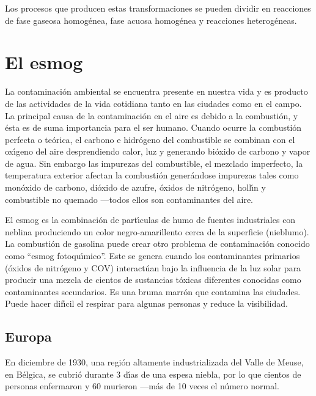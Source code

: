 Los procesos que producen estas transformaciones se pueden dividir en reacciones de fase gaseosa homog\'enea, fase acuosa homog\'enea y reacciones heterog\'eneas.

 \section{El esmog}
\label{sgmog}

 La contaminaci\'on ambiental se encuentra presente en nuestra vida y es producto de las actividades de la vida cotidiana tanto en las ciudades como en el campo. La principal causa de la contaminaci\'on en el aire es debido a la combusti\'on, y \'esta es de suma importancia para el ser humano. Cuando ocurre la combusti\'on perfecta o te\'orica, el carbono e hidr\'ogeno del combustible se combinan con el ox\'{\i}geno del aire desprendiendo calor, luz y generando bi\'oxido de carbono y vapor de agua. Sin embargo las impurezas del combustible, el mezclado imperfecto, la temperatura exterior afectan la combusti\'on gener\'andose impurezas tales como mon\'oxido de carbono, di\'oxido de azufre, \'oxidos de nitr\'ogeno, holl\'{\i}n y combustible no quemado ---todos ellos son contaminantes del aire.
 
 El esmog es la combinaci\'on de part\'{\i}culas de humo de fuentes industriales con neblina produciendo un color negro-amarillento cerca de la superficie (nieblumo). La combusti\'on de gasolina puede crear otro problema de contaminaci\'on conocido como ``esmog fotoqu\'{\i}mico''. Este se genera cuando los contaminantes primarios (\'oxidos de nitr\'ogeno y COV) interact\'uan bajo la influencia de la luz solar para producir una mezcla de cientos de sustancias t\'oxicas diferentes conocidas como contaminantes secundarios. Es una bruma marr\'on que contamina las ciudades. Puede hacer dif\'{\i}cil el respirar para algunas personas y reduce la visibilidad.

 \subsection{Europa}
En diciembre de 1930, una regi\'on altamente industrializada del Valle de Meuse, en B\'elgica, se cubri\'o durante 3 d\'{\i}as de una espesa niebla, por lo que cientos de personas enfermaron y 60 murieron ---m\'as de 10 veces el n\'umero normal.  

